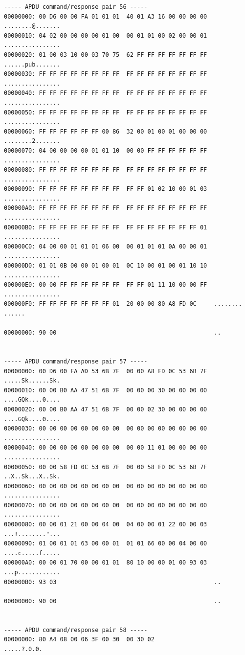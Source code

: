 \documentclass[bsc,frontabs,twoside,singlespacing,parskip,deptreport]{infthesis}     %
\begin{document}
\begin{appendices}
\begin{Verbatim}[commandchars=\\\{\}, fontsize=\small]
----- APDU command/response pair 56 -----
00000000: 00 D6 00 00 FA 01 01 01  40 01 A3 16 00 00 00 00  ........@.......
00000010: 04 02 00 00 00 00 01 00  00 01 01 00 02 00 00 01  ................
00000020: 01 00 03 10 00 03 70 75  62 FF FF FF FF FF FF FF  ......pub.......
00000030: FF FF FF FF FF FF FF FF  FF FF FF FF FF FF FF FF  ................
00000040: FF FF FF FF FF FF FF FF  FF FF FF FF FF FF FF FF  ................
00000050: FF FF FF FF FF FF FF FF  FF FF FF FF FF FF FF FF  ................
00000060: FF FF FF FF FF FF 00 86  32 00 01 00 01 00 00 00  ........2.......
00000070: 04 00 00 00 00 01 01 10  00 00 FF FF FF FF FF FF  ................
00000080: FF FF FF FF FF FF FF FF  FF FF FF FF FF FF FF FF  ................
00000090: FF FF FF FF FF FF FF FF  FF FF 01 02 10 00 01 03  ................
000000A0: FF FF FF FF FF FF FF FF  FF FF FF FF FF FF FF FF  ................
000000B0: FF FF FF FF FF FF FF FF  FF FF FF FF FF FF FF 01  ................
000000C0: 04 00 00 01 01 01 06 00  00 01 01 01 0A 00 00 01  ................
000000D0: 01 01 0B 00 00 01 00 01  0C 10 00 01 00 01 10 10  ................
000000E0: 00 00 FF FF FF FF FF FF  FF FF 01 11 10 00 00 FF  ................
000000F0: FF FF FF FF FF FF FF 01  20 00 00 80 A8 FD 0C     ........ ......

00000000: 90 00                                             ..


----- APDU command/response pair 57 -----
00000000: 00 D6 00 FA AD 53 6B 7F  00 00 A8 FD 0C 53 6B 7F  .....Sk......Sk.
00000010: 00 00 B0 AA 47 51 6B 7F  00 00 00 30 00 00 00 00  ....GQk....0....
00000020: 00 00 B0 AA 47 51 6B 7F  00 00 02 30 00 00 00 00  ....GQk....0....
00000030: 00 00 00 00 00 00 00 00  00 00 00 00 00 00 00 00  ................
00000040: 00 00 00 00 00 00 00 00  00 00 11 01 00 00 00 00  ................
00000050: 00 00 58 FD 0C 53 6B 7F  00 00 58 FD 0C 53 6B 7F  ..X..Sk...X..Sk.
00000060: 00 00 00 00 00 00 00 00  00 00 00 00 00 00 00 00  ................
00000070: 00 00 00 00 00 00 00 00  00 00 00 00 00 00 00 00  ................
00000080: 00 00 01 21 00 00 04 00  04 00 00 01 22 00 00 03  ...!........"...
00000090: 01 00 01 01 63 00 00 01  01 01 66 00 00 04 00 00  ....c.....f.....
000000A0: 00 00 01 70 00 00 01 01  80 10 00 00 01 00 93 03  ...p............
000000B0: 93 03                                             ..

00000000: 90 00                                             ..


----- APDU command/response pair 58 -----
00000000: 80 A4 08 00 06 3F 00 30  00 30 02                 .....?.0.0.


\end{Verbatim}
\end{appendices}
\end{document}
